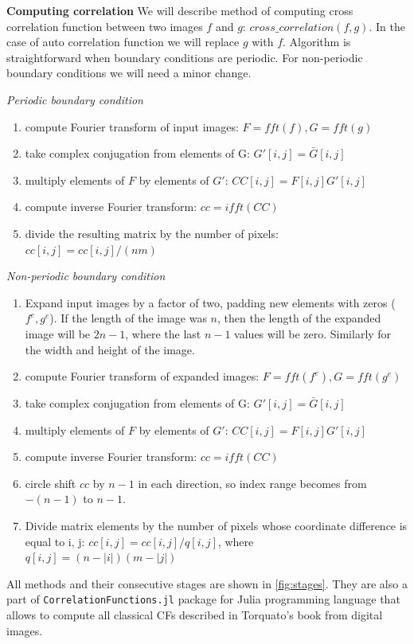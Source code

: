 \documentclass[reprint,amsmath,amssymb,aps,pre]{revtex4-1}
\newcommand{\code}[1]{\colorbox{light-gray}{\texttt{#1}}}
\begin{document}
\textbf{Computing correlation}
We will describe method of computing cross correlation function between two
images $f$ and $g$: $cross\_correlation(f, g)$. In the case of auto correlation
function we will replace $g$ with $f$. Algorithm is straightforward when
boundary conditions are periodic. For non-periodic boundary conditions we will
need a minor change.

\textit{Periodic boundary condition}
\begin{enumerate}
    \item compute Fourier transform of input images: $F = fft(f), G = fft(g)$
    \item take complex conjugation from elements of G: $G'[i, j] = \bar{G}[i, j]$
    \item multiply elements of $F$ by elements of $G'$: $CC[i, j] = F[i, j] G'[i, j]$
    \item compute inverse Fourier transform: $cc = ifft(CC)$
    \item divide the resulting matrix by the number of pixels: $cc[i, j] = cc[i, j] / (n m)$
\end{enumerate}

\textit{Non-periodic boundary condition}
\begin{enumerate}
    \item Expand input images by a factor of two, padding new elements with
      zeros ($f^e, g^e$). If the length of the image was $n$, then the length of
      the expanded image will be $2n - 1$, where the last $n - 1$ values will be
      zero. Similarly for the width and height of the image.
    \item compute Fourier transform of expanded images: $F = fft(f^e), G = fft(g^e)$
    \item take complex conjugation from elements of G: $G'[i, j] = \bar{G}[i, j]$
    \item multiply elements of $F$ by elements of $G'$: $CC[i, j] = F[i, j] G'[i, j]$
    \item compute inverse Fourier transform: $cc = ifft(CC)$
    \item circle shift $cc$ by $n - 1$ in each direction, so index range becomes
      from $-(n - 1)$ to $n - 1$.
    \item Divide matrix elements by the number of pixels whose coordinate
      difference is equal to i, j:
      $cc[i, j] = cc[i, j] / q[i, j]$, where $q[i, j] = (n - |i|)(m - |j|)$
\end{enumerate}

All methods and their consecutive stages are shown in \cref{fig:stages}. They
are also a part of \code{CorrelationFunctions.jl} package \cite{ourpapaer} for
Julia programming language that allows to compute all classical CFs described in
Torquato’s book \cite{Torq_book} from digital images.
\end{document}
